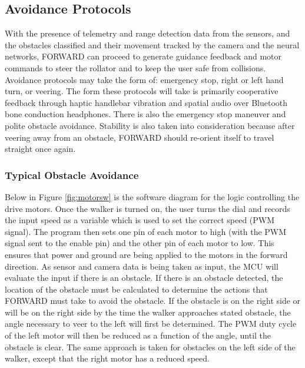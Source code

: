 \subsection{Avoidance Protocols}
\noindent With the presence of telemetry and range detection data from the sensors, and the obstacles classified and their movement tracked by the camera and the neural networks, FORWARD can proceed to generate guidance feedback and motor commands to steer the rollator and to keep the user safe from collisions. Avoidance protocols may take the form of: emergency stop, right or left hand turn, or veering. The form these protocols will take is primarily cooperative feedback through haptic handlebar vibration and spatial audio over Bluetooth bone conduction headphones. There is also the emergency stop maneuver and polite obstacle avoidance. Stability is also taken into consideration because after veering away from an obstacle, FORWARD should re-orient itself to travel straight once again.\\

\subsubsection{Typical Obstacle Avoidance}

\noindent Below in Figure \ref{fig:motorsw} is the software diagram for the logic controlling the drive motors. Once the walker is turned on, the user turns the dial and records the input speed as a variable which is used to set the correct speed (PWM signal). The program then sets one pin of each motor to high (with the PWM signal sent to the enable pin) and the other pin of each motor to low. This ensures that power and ground are being applied to the motors in the forward direction. As sensor and camera data is being taken as input, the MCU will evaluate the input if there is an obstacle. If there is an obstacle detected, the location of the obstacle must be calculated to determine the actions that FORWARD must take to avoid the obstacle. If the obstacle is on the right side or will be on the right side by the time the walker approaches stated obstacle, the angle necessary to veer to the left will first be determined. The PWM duty cycle of the left motor will then be reduced as a function of the angle, until the obstacle is clear. The same approach is taken for obstacles on the left side of the walker, except that the right motor has a reduced speed.\\

